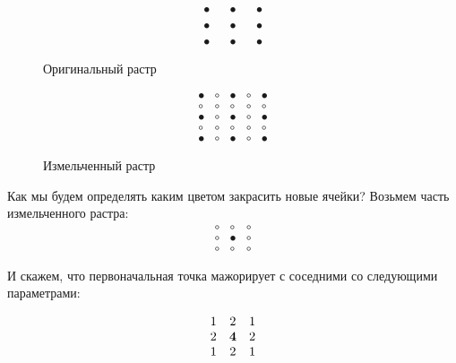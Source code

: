 \begin{figure}[h!]
    \centering
    \begin{minipage}{0.3\textwidth}
        $$
            \begin{matrix}
                \bullet &  & \bullet &  & \bullet \\ \\ \bullet & & \bullet & & \bullet \\ \\ \bullet &  & \bullet & &  \bullet
            \end{matrix}
        $$
        \caption{Оригинальный растр}
        \label{fig:rastr1}
    \end{minipage} %
    \hspace{0.1\textwidth}
    \begin{minipage}{0.3\textwidth}
        $$
            \begin{matrix}
                \bullet & \circ & \bullet & \circ & \bullet \\
                \circ   & \circ & \circ   & \circ & \circ   \\
                \bullet & \circ & \bullet & \circ & \bullet \\
                \circ   & \circ & \circ   & \circ & \circ   \\
                \bullet & \circ & \bullet & \circ & \bullet
            \end{matrix}
        $$
        \caption{Измельченный растр}
        \label{fig:rastr2}
    \end{minipage}
\end{figure}

Как мы будем определять каким цветом закрасить новые ячейки?
Возьмем часть измельченного растра:
$$
    \begin{matrix}
        \circ & \circ   & \circ \\
        \circ & \bullet & \circ \\
        \circ & \circ   & \circ
    \end{matrix}
$$

И скажем, что первоначальная точка мажорирует с соседними со следующими параметрами:

$$
    \begin{matrix} 1 & 2 & 1 \\ 2 & \bf4 & 2 \\ 1& 2 & 1 \end{matrix}
$$

